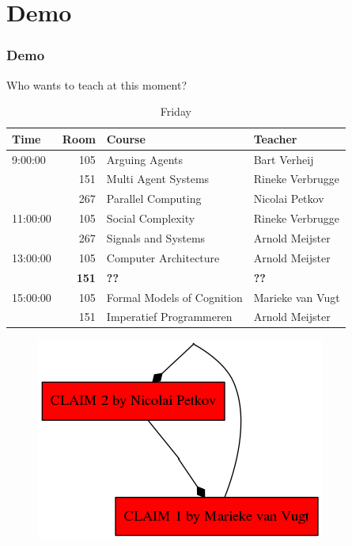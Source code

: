 \documentclass{beamer}
\begin{document}
\section{Demo}
\begin{frame}
	\frametitle{Demo}
	Who wants to teach at this moment?
	\fontsize{6}{7.2}\selectfont
	\begin{table}
		\centering
		\caption{Friday}
		\begin{tabular}{l|r|l|l}
			Time & Room & Course & Teacher \\ \hline
			\hline
			9:00:00 & 105 & Arguing Agents & Bart Verheij\\
			& 151 & Multi Agent Systems & Rineke Verbrugge\\
			& 267 & Parallel Computing & Nicolai Petkov\\\hline
			11:00:00 & 105 & Social Complexity & Rineke Verbrugge\\
			& 267 & Signals and Systems & Arnold Meijster\\\hline
			13:00:00 & 105 & Computer Architecture & Arnold Meijster\\
			& \textbf{151} & \textbf{??} & \textbf{??}\\\hline
			15:00:00 & 105 & Formal Models of Cognition & Marieke van Vugt\\
			& 151 & Imperatief Programmeren & Arnold Meijster\\
			\end{tabular}
	\end{table}
\end{frame}

\begin{frame}[plain]
	\begin{figure}
		\includegraphics[keepaspectratio,width=\textwidth,height=\textheight,]{demo/claims}
	\end{figure}
\end{frame}
\end{document}
